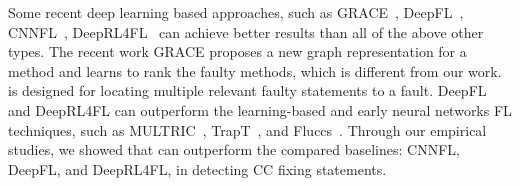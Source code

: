 Some recent deep learning based approaches, such as GRACE~\cite{lou2021boosting}, DeepFL~\cite{DeepFL}, CNNFL~\cite{zhang2019cnn}, DeepRL4FL~\cite{icse21-fl} can achieve better results than all of the above other types. The recent work GRACE proposes a new graph representation for a method and learns to rank the faulty methods, which is different from our work. {\tool} is designed for locating multiple relevant faulty statements to a fault. DeepFL and DeepRL4FL can outperform the learning-based and early neural networks FL techniques, such as MULTRIC~\cite{MULTRIC}, TrapT~\cite{TraPT}, and Fluccs~\cite{sohn2017fluccs}. Through our empirical studies, we showed that {\tool} can outperform the compared baselines: CNNFL, DeepFL, and DeepRL4FL, in detecting CC fixing statements.














\iffalse

